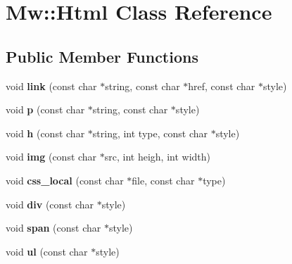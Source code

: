 \hypertarget{class_mw_1_1_html}{\section{Mw\-:\-:Html Class Reference}
\label{class_mw_1_1_html}
}
\subsection*{Public Member Functions}
\begin{DoxyCompactItemize}
\item 
\hypertarget{class_mw_1_1_html_adaae576118ad98604f55a1aa75ac61da}{void {\bfseries link} (const char $\ast$string, const char $\ast$href, const char $\ast$style)}\label{class_mw_1_1_html_adaae576118ad98604f55a1aa75ac61da}

\item 
\hypertarget{class_mw_1_1_html_a7cd36ec9d822667047f427205fda0aef}{void {\bfseries p} (const char $\ast$string, const char $\ast$style)}\label{class_mw_1_1_html_a7cd36ec9d822667047f427205fda0aef}

\item 
\hypertarget{class_mw_1_1_html_aecc793b35aaaf16fd6509c34f655a906}{void {\bfseries h} (const char $\ast$string, int type, const char $\ast$style)}\label{class_mw_1_1_html_aecc793b35aaaf16fd6509c34f655a906}

\item 
\hypertarget{class_mw_1_1_html_a0d038c1effef98c37847ce4f1151ec26}{void {\bfseries img} (const char $\ast$src, int heigh, int width)}\label{class_mw_1_1_html_a0d038c1effef98c37847ce4f1151ec26}

\item 
\hypertarget{class_mw_1_1_html_a0ad1c197fecacab5da49a51e7f60fd01}{void {\bfseries css\-\_\-local} (const char $\ast$file, const char $\ast$type)}\label{class_mw_1_1_html_a0ad1c197fecacab5da49a51e7f60fd01}

\item 
\hypertarget{class_mw_1_1_html_a4fe3b8171034069b25e9204da18d4960}{void {\bfseries div} (const char $\ast$style)}\label{class_mw_1_1_html_a4fe3b8171034069b25e9204da18d4960}

\item 
\hypertarget{class_mw_1_1_html_a226cd52d83ec3aadabaa454643fbf6f4}{void {\bfseries span} (const char $\ast$style)}\label{class_mw_1_1_html_a226cd52d83ec3aadabaa454643fbf6f4}

\item 
\hypertarget{class_mw_1_1_html_ac2b1a2b71d1b70832fc3dcb1cc3cd7ca}{void {\bfseries ul} (const char $\ast$style)}\label{class_mw_1_1_html_ac2b1a2b71d1b70832fc3dcb1cc3cd7ca}


\end{DoxyCompactItemize}

